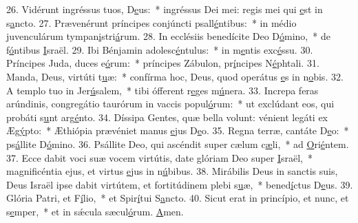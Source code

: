 26. Vidérunt ingréssus tuos, D\uline{e}us:~* ingréssus Dei mei: regis mei qui \uline{e}st in s\uline{a}ncto.
27. Prævenérunt príncipes conjúncti psall\uline{é}ntibus:~* in médio juvenculárum tympan\uline{i}stri\uline{á}rum.
28. In ecclésiis benedícite Deo D\uline{ó}mino,~* de f\uline{ó}ntibus \uline{I}sraël.
29. Ibi Bénjamin adolesc\uline{é}ntulus:~* in m\uline{e}ntis exc\uline{é}ssu.
30. Príncipes Juda, duces e\uline{ó}rum:~* príncipes Zábulon, pr\uline{í}ncipes N\uline{é}phtali.
31. Manda, Deus, virtúti t\uline{u}æ:~* confírma hoc, Deus, quod operátus \uline{e}s in n\uline{o}bis.
32. A templo tuo in Jer\uline{ú}salem,~* tibi ófferent r\uline{e}ges m\uline{ú}nera.
33. Increpa feras arúndinis, congregátio taurórum in vaccis popul\uline{ó}rum:~* ut exclúdant eos, qui probáti s\uline{u}nt arg\uline{é}nto.
34. Díssipa Gentes, quæ bella volunt: vénient legáti ex Æg\uline{ý}pto:~* Æthiópia prævéniet manus \uline{e}jus D\uline{e}o.
35. Regna terræ, cantáte D\uline{e}o:~* ps\uline{á}llite D\uline{ó}mino.
36. Psállite Deo, qui ascéndit super cælum c\uline{æ}li,~* ad \uline{O}ri\uline{é}ntem.
37. Ecce dabit voci suæ vocem virtútis, date glóriam Deo super \uline{I}sraël,~* magnificéntia ejus, et virtus \uline{e}jus in n\uline{ú}bibus.
38. Mirábilis Deus in sanctis suis, Deus Israël ipse dabit virtútem, et fortitúdinem plebi s\uline{u}æ,~* bened\uline{í}ctus D\uline{e}us.
39. Glória Patri, et F\uline{í}lio,~* et Spir\uline{í}tui S\uline{a}ncto.
40. Sicut erat in princípio, et nunc, et s\uline{e}mper,~* et in sǽcula sæcul\uline{ó}rum. \uline{A}men.
